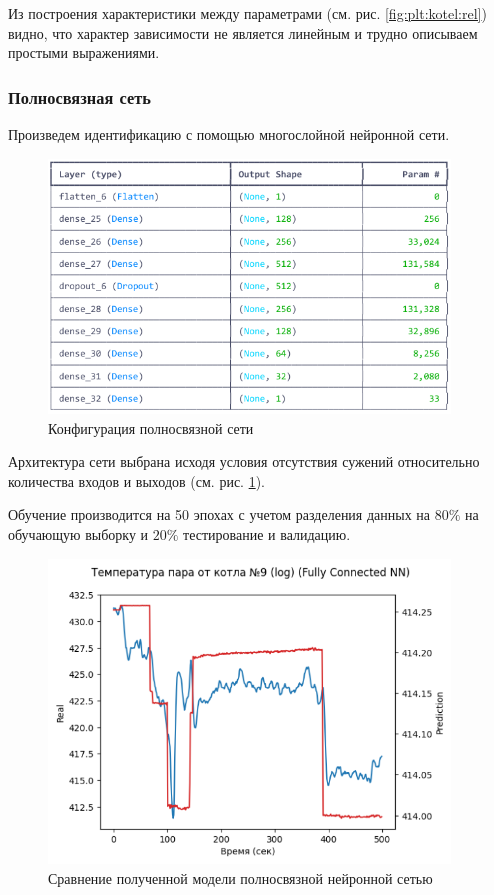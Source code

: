 Из построения характеристики между параметрами (см. рис.
\ref{fig:plt:kotel:rel}) видно, что характер зависимости не является
линейным и трудно описываем простыми выражениями. 

\subsubsection{Полносвязная сеть}

Произведем идентификацию с помощью многослойной
нейронной сети. 

\begin{figure}[H]
  \begin{center}
    \includegraphics[width=0.95\textwidth]{figures/tensorflow/dense.png}
  \end{center}
  \caption{Конфигурация полносвязной сети}\label{fig:tf:dense}
\end{figure}

Архитектура сети выбрана исходя условия отсутствия
сужений относительно количества входов и выходов (см.
рис. \ref{fig:tf:dense}). 

Обучение производится на 50 эпохах с учетом
разделения данных на $80\%$ на обучающую выборку и
$20\%$ тестирование и валидацию. 

\begin{figure}[H]
  \begin{center}
    \includegraphics[width=0.95\textwidth]{figures/tensorflow/dense_compare.png}
  \end{center}
  \caption{Сравнение полученной модели полносвязной нейронной сетью}\label{fig:tf:cmp:dense}
\end{figure}

